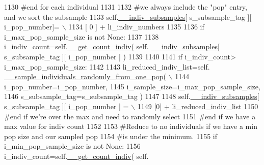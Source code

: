 \begin{DoxyCode}
1130             \textcolor{comment}{#end for each individual}
1131 
1132             \textcolor{comment}{#we always include the "pop" entry, and we sort the subsample}
1133             self.\hyperlink{classnegui_1_1genepopfilemanager_1_1GenepopFileManager_a1e8379bcee4902ca9314ff53fcb71644}{\_\_indiv\_subsamples}[ s\_subsample\_tag ][ i\_pop\_number]= \(\backslash\)
1134                                                  [ 0 ] +  li\_indiv\_numbers
1135 
1136             \textcolor{keywordflow}{if} i\_max\_pop\_sample\_size \textcolor{keywordflow}{is} \textcolor{keywordflow}{not} \textcolor{keywordtype}{None}:
1137 
1138                 i\_indiv\_count=self.\hyperlink{classnegui_1_1genepopfilemanager_1_1GenepopFileManager_ac7cc98fe56efee82b4ffd4dc816a4704}{\_\_get\_count\_indiv}( self.
      \hyperlink{classnegui_1_1genepopfilemanager_1_1GenepopFileManager_a1e8379bcee4902ca9314ff53fcb71644}{\_\_indiv\_subsamples}[ s\_subsample\_tag ][ i\_pop\_number ] )
1139 
1140                 
1141                 \textcolor{keywordflow}{if} i\_indiv\_count> i\_max\_pop\_sample\_size:
1142 
1143                     li\_reduced\_indiv\_list=self.
      \hyperlink{classnegui_1_1genepopfilemanager_1_1GenepopFileManager_a9818467c9cb40f8e1de0c6cc7f52e263}{\_\_sample\_individuals\_randomly\_from\_one\_pop}( \(\backslash\)
1144                                                             i\_pop\_number=i\_pop\_number,
1145                                                             i\_sample\_size=i\_max\_pop\_sample\_size,
1146                                                             s\_subsample\_tag=s\_subsample\_tag )
1147 
1148                     self.\hyperlink{classnegui_1_1genepopfilemanager_1_1GenepopFileManager_a1e8379bcee4902ca9314ff53fcb71644}{\_\_indiv\_subsamples}[ s\_subsample\_tag ][ i\_pop\_number ] = \(\backslash\)
1149                                                         [0] + li\_reduced\_indiv\_list
1150                 \textcolor{comment}{#end if we're over the max and need to randomly select}
1151             \textcolor{comment}{#end if we have a max value for indiv count}
1152 
1153             \textcolor{comment}{#Reduce to no individuals if we have a min pop size and our sampled pop}
1154             \textcolor{comment}{#is under the minimum.}
1155             \textcolor{keywordflow}{if} i\_min\_pop\_sample\_size \textcolor{keywordflow}{is} \textcolor{keywordflow}{not} \textcolor{keywordtype}{None}:
1156                 i\_indiv\_count=self.\hyperlink{classnegui_1_1genepopfilemanager_1_1GenepopFileManager_ac7cc98fe56efee82b4ffd4dc816a4704}{\_\_get\_count\_indiv}( self.

\end{DoxyCode}
